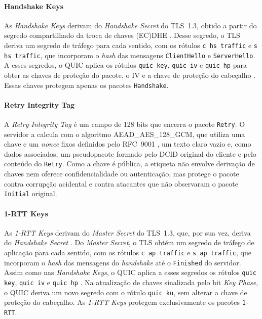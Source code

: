 \paragraph{Handshake Keys}

As \textit{Handshake Keys} derivam do \textit{Handshake Secret} do TLS~1.3, obtido a partir do segredo compartilhado da troca de chaves (EC)DHE \citep{rfc8446}. Desse segredo, o TLS deriva um segredo de tráfego para cada sentido, com os rótulos \texttt{c hs traffic} e \texttt{s hs traffic}, que incorporam o \textit{hash} das mensagens \texttt{ClientHello} e \texttt{ServerHello}. A esses segredos, o QUIC aplica os rótulos \texttt{quic key}, \texttt{quic iv} e \texttt{quic hp} para obter as chaves de proteção do pacote, o IV e a chave de proteção do cabeçalho \citep{rfc9001}. Essas chaves protegem apenas os pacotes \texttt{Handshake}.

\paragraph{Retry Integrity Tag}
\label{sec:quic_retry_integrity_tag}

A \textit{Retry Integrity Tag} é um campo de 128 bits que encerra o pacote \texttt{Retry}. O servidor a calcula com o algoritmo AEAD\_AES\_128\_GCM, que utiliza uma chave e um \textit{nonce} fixos definidos pelo RFC~9001 \citep{rfc9001}, um texto claro vazio e, como dados associados, um pseudopacote formado pelo DCID original do cliente e pelo conteúdo do \texttt{Retry}. Como a chave é pública, a etiqueta não envolve derivação de chaves nem oferece confidencialidade ou autenticação, mas protege o pacote contra corrupção acidental e contra atacantes que não observaram o pacote \texttt{Initial} original.

\paragraph{1-RTT Keys}

As \textit{1-RTT Keys} derivam do \textit{Master Secret} do TLS~1.3, que, por sua vez, deriva do \textit{Handshake Secret} \citep{rfc8446}. Do \textit{Master Secret}, o TLS obtém um segredo de tráfego de aplicação para cada sentido, com os rótulos \texttt{c ap traffic} e \texttt{s ap traffic}, que incorporam o \textit{hash} das mensagens do \textit{handshake} até o \texttt{Finished} do servidor. Assim como nas \textit{Handshake Keys}, o QUIC aplica a esses segredos os rótulos \texttt{quic key}, \texttt{quic iv} e \texttt{quic hp} \citep{rfc9001}. Na atualização de chaves sinalizada pelo bit \textit{Key Phase}, o QUIC deriva um novo segredo com o rótulo \texttt{quic ku}, sem alterar a chave de proteção do cabeçalho. As \textit{1-RTT Keys} protegem exclusivamente os pacotes \texttt{1-RTT}.

